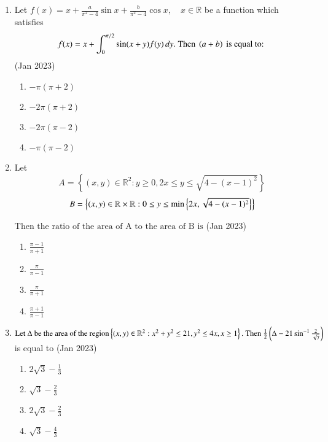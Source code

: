 \documentclass[journal,12pt,onecolumn]{IEEEtran}
\theoremstyle{remark}
\begin{document}
\begin{enumerate}
\item 
Let 
$ f(x) = x + \frac{a}{\pi^2 - 4} \sin x + \frac{b}{\pi^2 - 4} \cos x, \quad x \in \mathbb{R} $ 
be a function which satisfies 
\begin{align*} 
f(x) = x + \int_0^{\pi/2} \sin(x + y) f(y) \, dy.  
\text{ Then }  \left(a + b\right) \text{ is equal to: }
\end{align*}\hfill(Jan 2023)
\begin{multicols}{4}
\begin{enumerate}
   \item $-\pi(\pi + 2) $
   \item $-2\pi(\pi + 2) $
   \item $-2\pi(\pi - 2) $
   \item $-\pi(\pi - 2) $
\end{enumerate}
\end{multicols}
\item Let \quad $$A = \left\{ (x, y) \in \mathbb{R}^2: y \geq 0, 2x \leq y \leq \sqrt{4 - (x-1)^2} \right\}$$ $$B = \left\{ (x, y) \in \mathbb{R} \times \mathbb{R}: 0 \leq y \leq \min \left\{ 2x, \sqrt{4 - (x-1)^2} \right\}\right\}$$

$\text{Then the ratio of the area of A to the area of B is}$
\hfill(Jan 2023)
\begin{multicols}{2}
   \begin{enumerate}
       \item $ \frac{\pi - 1}{\pi + 1}$\\
     \item $ \frac{\pi}{\pi - 1}$
    \item $ \frac{\pi}{\pi + 1}$\\
     \item $ \frac{\pi + 1}{\pi - 1}$
   \end{enumerate}
\end{multicols}

\item $\text{Let } \Delta \text{ be the area of the region}
\left\{ (x, y) \in \mathbb{R}^2: x^2 + y^2 \leq 21, y^2 \leq 4x, x \geq 1\right\}. \text{ Then } \frac{1}{2} \left(\Delta - 21 \sin^{-1} \frac{2}{\sqrt{7}}\right)$ is equal to \hfill(Jan 2023)
\begin{multicols}{2}
\begin{enumerate}
    \item $2\sqrt{3} - \frac{1}{3}$\\
    \item $\sqrt{3} - \frac{2}{3}$
    \item $2\sqrt{3} - \frac{2}{3}$\\
    \item $\sqrt{3} - \frac{4}{3}$
\end{enumerate}
\end{multicols}


\end{enumerate}
\end{document}
